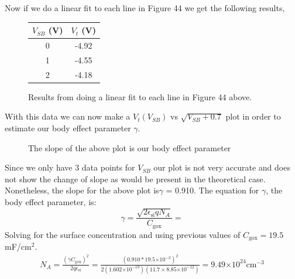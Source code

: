 \documentclass{article}
\providecommand{\e}[1]{\ensuremath{\times 10^{#1}}}
\begin{document}
Now if we do a linear fit to each line in Figure 44 we get the following results,

\begin{figure}[H]
\centering
\begin{tabular}{c || c}
$V_{SB}$ (V) & $V_t$ (V) \\ \hline
0 & -4.92 \\ \hline
1 & -4.55 \\ \hline
2 & -4.18 \\ \hline
\end{tabular}
\caption{Results from doing a linear fit to each line in Figure 44 above.}
\end{figure}

With this data we can now make a $V_t(V_{SB})$ vs $\sqrt{V_{SB} + 0.7}$ plot in order to estimate our body effect parameter $\gamma$.
\begin{figure}[H]
\centering
{}
\caption{The slope of the above plot is our body effect parameter}
\end{figure}
Since we only have 3 data points for $V_{SB}$ our plot is not very accurate and does not show the change of slope as would be present in the theoretical case. Nonetheless, the slope for the above plot is$\gamma$ = 0.910. The equation for $\gamma$, the body effect parameter, is:
\begin{equation}
\gamma = \frac{\sqrt{2\epsilon_{\text{si}} q N_A}}{C_{\text{gox}}} = 
\end{equation}
Solving for the surface concentration and using previous values of $C_{\text{gox}} = 19.5 $mF/${\text{cm}}^2$.
\begin{align*}
N_A = \frac{(\gamma C_{\text{gox}})^2}{2q\epsilon_{\text{si}}} = \frac{(0.910*19.5\e{-3})^2}{2(1.602\e{-19})(11.7\times 8.85\e{-12})} = 9.49\e{24} {\text{cm}}^{-3}
\end{align*}
\end{document}
